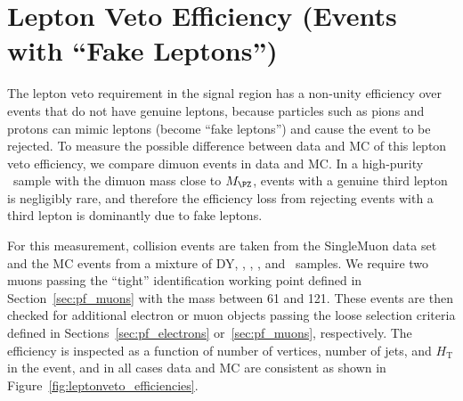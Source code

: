\section{Lepton Veto Efficiency (Events with ``Fake Leptons'')}
\label{sec:fake_lepton_veto}
The lepton veto requirement in the signal region has a non-unity efficiency over events that do not have genuine leptons, because particles such as pions and protons can mimic leptons (become ``fake leptons'') and cause the event to be rejected. 
To measure the possible difference between data and MC of this lepton veto efficiency, we compare dimuon events in data and MC. 
In a high-purity \Zmm\  sample with the dimuon mass close to $M_{\PZ}$, events with a genuine third lepton is negligibly rare, and therefore the efficiency loss from rejecting events with a third lepton is dominantly due to fake leptons.

For this measurement, collision events are taken from the SingleMuon data set and the MC events from a mixture of DY, \ttbar, \PW\PW, \PW\PZ, and \PZ\PZ\ samples. 
We require two muons passing the ``tight'' identification working point defined in Section~\ref{sec:pf_muons} with the mass between 61 and 121\GeV. 
These events are then checked for additional electron or muon objects passing the loose selection criteria defined in Sections~\ref{sec:pf_electrons} or~\ref{sec:pf_muons}, respectively. 
The efficiency is inspected as a function of number of vertices, number of jets, and $H_{\mathrm{T}}$ in the event, and in all cases data and MC are consistent as shown in Figure~\ref{fig:leptonveto_efficiencies}.

